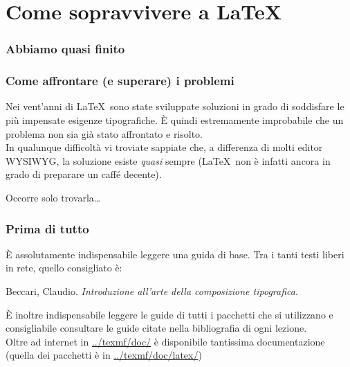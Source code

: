 \documentclass[svgnames,%
	ucs,%
	pdftex]{guitbeamer}
\begin{document}
\section{Come sopravvivere a \LaTeX}
\begin{frame}
  \frametitle{Abbiamo quasi finito}
\end{frame}
\begin{frame}
  \frametitle{Come affrontare (e superare) i problemi}
	Nei vent'anni di \LaTeX\ sono state sviluppate soluzioni in grado di soddisfare le pi\`u impensate esigenze tipografiche. \`E quindi estremamente improbabile che un problema non sia gi\`a stato affrontato e risolto.\\
  \bigskip
	In qualunque difficolt\`a vi troviate sappiate che, a differenza di molti editor WYSIWYG, la soluzione esiste \emph{quasi} sempre (\LaTeX\ non \`e infatti ancora in grado di preparare un caff\'e decente). 
	\begin{center}
		Occorre solo trovarla\dots
	\end{center}
\end{frame}
\begin{frame}
	\frametitle{Prima di tutto}
	\`E assolutamente indispensabile leggere una guida di base. Tra i tanti testi liberi in rete, quello consigliato \`e:
	\begin{thebibliography}{Wel66}
			Beccari, Claudio.
			\newblock \textit{Introduzione all'arte della composizione tipografica}.
	\end{thebibliography}
  \smallskip
	\`E inoltre indispensabile leggere le guide di tutti i pacchetti che
	si utilizzano e consigliabile consultare le guide citate nella
	bibliografia di ogni lezione.\\
  \smallskip
	Oltre ad internet in \url{../texmf/doc/} \`e disponibile tantissima
	documentazione (quella dei pacchetti \`e in \url{../texmf/doc/latex/})
\end{frame}
\end{document}
